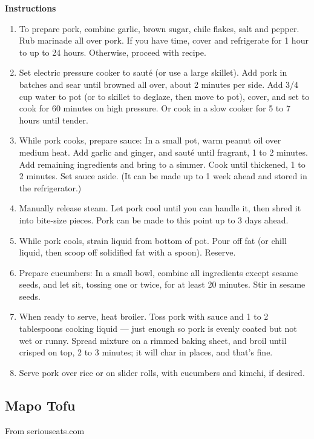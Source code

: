 \documentclass{article}
\numberwithin{figure}{section}
\numberwithin{equation}{section}
\begin{document}
{\bf Instructions}
\begin{enumerate}
\item To prepare pork, combine garlic, brown sugar, chile flakes, salt and pepper. Rub marinade all over pork. If you have time, cover and refrigerate for 1 hour to up to 24 hours. Otherwise, proceed with recipe.

\item Set electric pressure cooker to sauté (or use a large skillet). Add pork in batches and sear until browned all over, about 2 minutes per side. Add 3/4 cup water to pot (or to skillet to deglaze, then move to pot), cover, and set to cook for 60 minutes on high pressure. Or cook in a slow cooker for 5 to 7 hours until tender.

\item While pork cooks, prepare sauce: In a small pot, warm peanut oil over medium heat. Add garlic and ginger, and sauté until fragrant, 1 to 2 minutes. Add remaining ingredients and bring to a simmer. Cook until thickened, 1 to 2 minutes. Set sauce aside. (It can be made up to 1 week ahead and stored in the refrigerator.)

\item Manually release steam. Let pork cool until you can handle it, then shred it into bite-size pieces. Pork can be made to this point up to 3 days ahead.

\item While pork cools, strain liquid from bottom of pot. Pour off fat (or chill liquid, then scoop off solidified fat with a spoon). Reserve.

\item Prepare cucumbers: In a small bowl, combine all ingredients except sesame seeds, and let sit, tossing one or twice, for at least 20 minutes. Stir in sesame seeds.

\item When ready to serve, heat broiler. Toss pork with sauce and 1 to 2 tablespoons cooking liquid — just enough so pork is evenly coated but not wet or runny. Spread mixture on a rimmed baking sheet, and broil until crisped on top, 2 to 3 minutes; it will char in places, and that's fine.

\item Serve pork over rice or on slider rolls, with cucumbers and kimchi, if desired.
\end{enumerate}


\pagebreak
\subsection{Mapo Tofu}
From seriouseats.com\\
\end{document}
